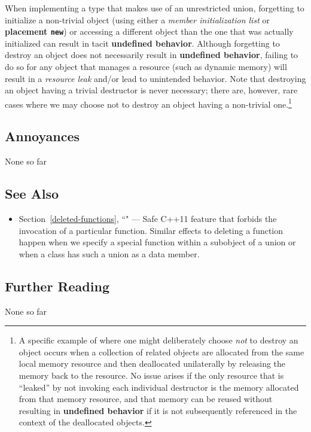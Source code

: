 When implementing a type that makes use of an unrestricted union,
forgetting to initialize a non-trivial object (using either a
\emph{member initialization list} or \textbf{placement \texttt{new}}) or
accessing a different object than the one that was actually initialized
can result in tacit \textbf{undefined behavior}. Although forgetting to
destroy an object does not necessarily result in \textbf{undefined
behavior}, failing to do so for any object that manages a resource (such
as dynamic memory) will result in a \emph{resource leak} and/or lead to
unintended behavior. Note that destroying an
object having a trivial destructor is never necessary; there are, however, rare cases where
we may choose not to destroy an object having a non-trivial
one.{\cprotect\footnote{A specific example of where one might
deliberately choose \emph{not} to destroy an object occurs when a
collection of related objects are allocated from the same local memory
resource and then deallocated unilaterally by releasing the memory
back to the resource. No issue arises if the only resource that is ``leaked''
by not invoking each individual destructor is the memory allocated
from that memory resource, and that memory can be
reused without resulting in \textbf{undefined behavior} if it
is not subsequently referenced in the context of the deallocated
objects.}}

\subsection[Annoyances]{Annoyances}\label{annoyances}

None so far

\subsection[See Also]{See Also}\label{see-also}

\begin{itemize}
\item{Section~\ref{deleted-functions}, ``" — Safe C++11 feature that forbids the invocation of a particular function. Similar effects to deleting a function happen when we specify a special function within a subobject of a union or when a class has such a union as a data member.}
\end{itemize}

\subsection[Further Reading]{Further Reading}\label{further-reading}

None so far


